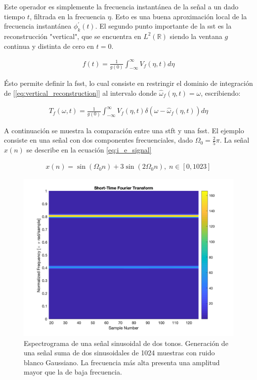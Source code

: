 \indent Este operador es simplemente la frecuencia instantánea de la señal a un dado tiempo $t$, filtrada en la
frecuencia $\eta$. Esto es una buena aproximación local de la frecuencia instantánea $\phi_k^{'}(t)$. El segundo
punto importante de la \acrshort{sst} es la reconstrucción "vertical", que se encuentra en $L^2(\mathbb{R})$ siendo
la ventana $g$ continua y distinta de cero en $t=0$.

\begin{align} \label{eq:vertical_reconstruction}
  f(t) = \frac{1}{g(0)} \int_{-\infty}^\infty V_f(\eta,t)d\eta
\end{align}

\indent Ésto permite definir la \acrshort{fsst}, lo cual consiste en restringir el dominio de integración de
[\ref{eq:vertical_reconstruction}] al intervalo donde $\hat{\omega}_f(\eta,t) = \omega$, escribiendo:

\begin{align}
  T_f(\omega,t) = \frac{1}{g(0)} \int_{-\infty}^\infty V_f(\eta,t)\delta(\omega-\hat{\omega}_f(\eta,t))d\eta
\end{align}

\indent A continuación se muestra la comparación entre una \acrshort{stft} y una \acrshort{fsst}. El ejemplo
consiste en una señal con dos componentes frecuenciales, dado $\Omega_0=\frac{2}{5}\pi$. La señal $x(n)$ se describe
en la ecuación \ref{eq:i_e_signal}

\begin{align} \label{eq:i_e_signal}
  x(n) = \sin(\Omega_0 n) + 3\sin(2\Omega_0 n), \; n \in [0,1023]
\end{align}

\begin{figure}[H]
\centering
\includegraphics[scale=0.35]{sections/chapter-05/images/stft.png}
\caption[Espectrograma de una señal sinusoidal de dos tonos]{Espectrograma de una señal sinusoidal de dos tonos.
Generación de una señal suma de dos sinusoidales de 1024 muestras con ruido blanco Gaussiano. La frecuencia más alta
presenta una amplitud mayor que la de baja frecuencia.}
\label{fig:i_e_stft}
\end{figure}

